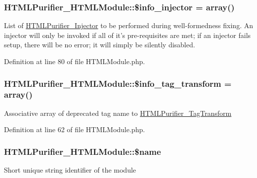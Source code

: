 \hypertarget{classHTMLPurifier__HTMLModule_a68a3f58ec05cf9b1aceb0ee0966dc4fa}{
\subsubsection[{\$info\+\_\+injector}]{\setlength{\rightskip}{0pt plus 5cm}H\+T\+M\+L\+Purifier\+\_\+\+H\+T\+M\+L\+Module\+::\$info\+\_\+injector = array()}}\label{classHTMLPurifier__HTMLModule_a68a3f58ec05cf9b1aceb0ee0966dc4fa}
List of \hyperlink{classHTMLPurifier__Injector}{H\+T\+M\+L\+Purifier\+\_\+\+Injector} to be performed during well-\/formedness fixing. An injector will only be invoked if all of it's pre-\/requisites are met; if an injector fails setup, there will be no error; it will simply be silently disabled. 

Definition at line 80 of file H\+T\+M\+L\+Module.\+php.

\hypertarget{classHTMLPurifier__HTMLModule_a9cd963895282a192b432ebef787fe93b}{
\subsubsection[{\$info\+\_\+tag\+\_\+transform}]{\setlength{\rightskip}{0pt plus 5cm}H\+T\+M\+L\+Purifier\+\_\+\+H\+T\+M\+L\+Module\+::\$info\+\_\+tag\+\_\+transform = array()}}\label{classHTMLPurifier__HTMLModule_a9cd963895282a192b432ebef787fe93b}
Associative array of deprecated tag name to \hyperlink{classHTMLPurifier__TagTransform}{H\+T\+M\+L\+Purifier\+\_\+\+Tag\+Transform} 

Definition at line 62 of file H\+T\+M\+L\+Module.\+php.

\hypertarget{classHTMLPurifier__HTMLModule_a10f7d43e478f76541c170593453b9e50}{
\subsubsection[{\$name}]{\setlength{\rightskip}{0pt plus 5cm}H\+T\+M\+L\+Purifier\+\_\+\+H\+T\+M\+L\+Module\+::\$name}}\label{classHTMLPurifier__HTMLModule_a10f7d43e478f76541c170593453b9e50}
Short unique string identifier of the module 

